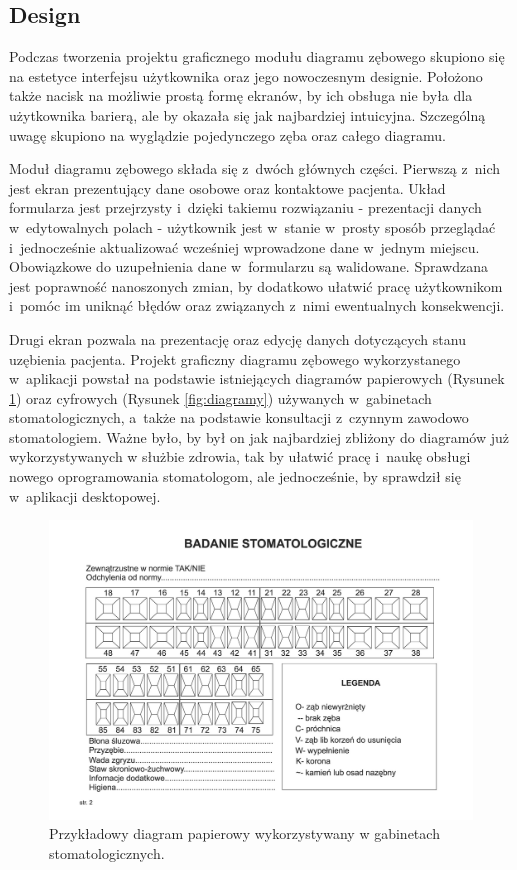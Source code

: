 \subsection{Design}

Podczas tworzenia projektu graficznego modułu diagramu zębowego skupiono się na estetyce interfejsu użytkownika oraz jego nowoczesnym designie. Położono także nacisk na możliwie prostą formę ekranów, by ich obsługa nie była dla użytkownika barierą, ale by okazała się jak najbardziej intuicyjna. Szczególną uwagę skupiono na wyglądzie pojedynczego zęba oraz całego diagramu.

Moduł diagramu zębowego składa się z~dwóch głównych części. Pierwszą z~nich jest ekran prezentujący dane osobowe oraz kontaktowe pacjenta. Układ formularza jest przejrzysty i~dzięki takiemu rozwiązaniu - prezentacji danych w~edytowalnych polach - użytkownik jest w~stanie w~prosty sposób przeglądać i~jednocześnie aktualizować wcześniej wprowadzone dane w~jednym miejscu. Obowiązkowe do uzupełnienia dane w~formularzu są walidowane. Sprawdzana jest poprawność nanoszonych zmian, by dodatkowo ułatwić pracę użytkownikom i~pomóc im uniknąć błędów oraz związanych z~nimi ewentualnych konsekwencji.

Drugi ekran pozwala na prezentację oraz edycję danych dotyczących stanu uzębienia pacjenta. Projekt graficzny diagramu zębowego wykorzystanego w~aplikacji powstał na podstawie istniejących diagramów papierowych (Rysunek \ref{fig:karta}) oraz cyfrowych (Rysunek \ref{fig:diagramy}) używanych w~gabinetach stomatologicznych, a~także na podstawie konsultacji z~czynnym zawodowo stomatologiem. Ważne było, by był on jak najbardziej zbliżony do diagramów już wykorzystywanych w służbie zdrowia, tak by ułatwić pracę i~naukę obsługi nowego oprogramowania stomatologom, ale jednocześnie, by sprawdził się w~aplikacji desktopowej.

\begin{figure}[t!]
\centering\includegraphics[width=\textwidth]{figures/karta.jpg}
\caption{Przykładowy diagram papierowy wykorzystywany w gabinetach stomatologicznych.\cite{Roydental}}
\label{fig:karta}
\end{figure}

